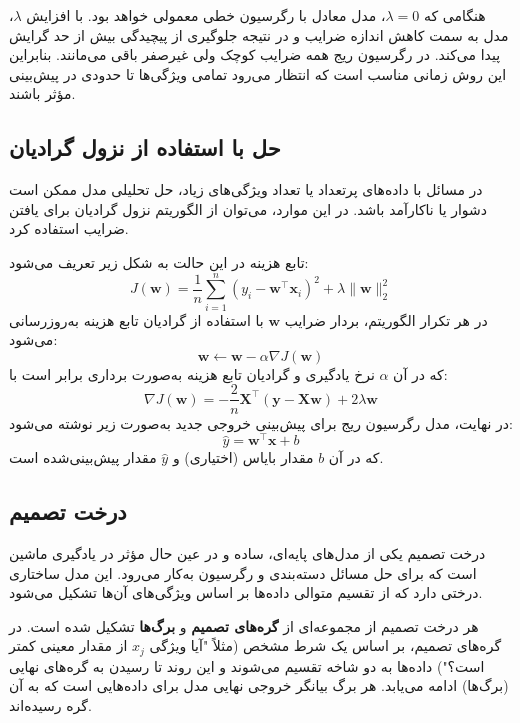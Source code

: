 هنگامی که $\lambda = 0$، مدل معادل با رگرسیون خطی معمولی خواهد بود. با افزایش $\lambda$، مدل به سمت کاهش اندازه ضرایب و در نتیجه جلوگیری از پیچیدگی بیش‌ از حد گرایش پیدا می‌کند. در رگرسیون ریج همه ضرایب کوچک ولی غیرصفر باقی می‌مانند. بنابراین این روش زمانی مناسب است که انتظار می‌رود تمامی ویژگی‌ها تا حدودی در پیش‌بینی مؤثر باشند.

\vspace{0.5em}
\subsection*{حل با استفاده از نزول گرادیان}

در مسائل با داده‌های پرتعداد یا تعداد ویژگی‌های زیاد، حل تحلیلی مدل ممکن است دشوار یا ناکارآمد باشد. در این موارد، می‌توان از الگوریتم نزول گرادیان برای یافتن ضرایب استفاده کرد.

تابع هزینه در این حالت به شکل زیر تعریف می‌شود:
\[
J(\boldsymbol{w}) = \frac{1}{n} \sum_{i=1}^{n} \left( y_i - \boldsymbol{w}^\top \boldsymbol{x}_i \right)^2 + \lambda \| \boldsymbol{w} \|_2^2
\]
در هر تکرار الگوریتم، بردار ضرایب $\boldsymbol{w}$ با استفاده از گرادیان تابع هزینه به‌روزرسانی می‌شود:
\[
\boldsymbol{w} \leftarrow \boldsymbol{w} - \alpha \nabla J(\boldsymbol{w})
\]
که در آن $\alpha$ نرخ یادگیری و گرادیان تابع هزینه به‌صورت برداری برابر است با:
\[
\nabla J(\boldsymbol{w}) = -\frac{2}{n} \boldsymbol{X}^\top \left( \boldsymbol{y} - \boldsymbol{Xw} \right) + 2\lambda \boldsymbol{w}
\]
در نهایت، مدل رگرسیون ریج برای پیش‌بینی خروجی جدید به‌صورت زیر نوشته می‌شود:
\[
\hat{y} = \boldsymbol{w}^\top \boldsymbol{x} + b
\]
که در آن $b$ مقدار بایاس (اختیاری) و $\hat{y}$ مقدار پیش‌بینی‌شده است.

\subsection[درخت تصمیم]{درخت تصمیم}

درخت تصمیم یکی از مدل‌های پایه‌ای، ساده و در عین حال مؤثر در یادگیری ماشین است که برای حل مسائل دسته‌بندی و رگرسیون به‌کار می‌رود. این مدل ساختاری درختی دارد که از تقسیم متوالی داده‌ها بر اساس ویژگی‌های آن‌ها تشکیل می‌شود.

هر درخت تصمیم از مجموعه‌ای از \textbf{گره‌های تصمیم} و \textbf{برگ‌ها} تشکیل شده است. در گره‌های تصمیم، بر اساس یک شرط مشخص (مثلاً "آیا ویژگی $x_j$ از مقدار معینی کمتر است؟") داده‌ها به دو شاخه تقسیم می‌شوند و این روند تا رسیدن به گره‌های نهایی (برگ‌ها) ادامه می‌یابد. هر برگ بیانگر خروجی نهایی مدل برای داده‌هایی است که به آن گره رسیده‌اند.

